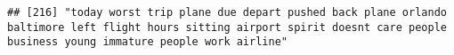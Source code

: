 \documentclass[
]{article}
\begin{document}
\begin{verbatim}
## [216] "today worst trip plane due depart pushed back plane orlando baltimore left flight hours sitting airport spirit doesnt care people business young immature people work airline"                                                                                                                                                                                                                                                                                                                                                                                                                                                                                                                                                                                                                                                                                                                                                                                                                                                                                                                                                                                                                                                                                                                                                                                                                                                                                                                                                                                                                                                                                                                                                                                                                 

\end{verbatim}
\end{document}
